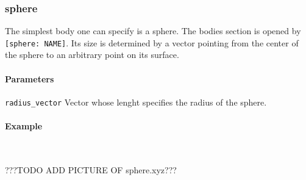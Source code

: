 \subsubsection{sphere}
The simplest body one can specify is a sphere. The bodies section is opened by \lstinline{[sphere: NAME]}. Its size is determined by a  vector pointing from the center of the sphere to an arbitrary point on its surface.

\paragraph{Parameters}
\begin{description}
 \item{\lstinline{radius_vector}} Vector whose lenght specifies the radius of the sphere.
\end{description}

\paragraph{Example}\ 


???TODO ADD PICTURE OF sphere.xyz???